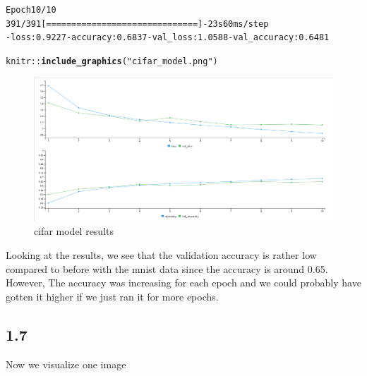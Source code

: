 \documentclass[10pt, a4paper, english]{article}\usepackage[]{graphicx}\usepackage[dvipsnames]{xcolor}
\makeatletter
\def\maxwidth{ %
  \ifdim\Gin@nat@width>\linewidth
    \linewidth
  \else
    \Gin@nat@width
  \fi
}
\newcommand{\hlstr}[1]{\textcolor[rgb]{0.192,0.494,0.8}{#1}}%
\newcommand{\hlopt}[1]{\textcolor[rgb]{0,0,0}{#1}}%
\newcommand{\hlstd}[1]{\textcolor[rgb]{0.345,0.345,0.345}{#1}}%
\newcommand{\hlkwd}[1]{\textcolor[rgb]{0.737,0.353,0.396}{\textbf{#1}}}%
\newenvironment{kframe}{%
 \def\at@end@of@kframe{}%
 \ifinner\ifhmode%
  \def\at@end@of@kframe{\end{minipage}}%
  \begin{minipage}{\columnwidth}%
 \fi\fi%
 \def\FrameCommand##1{\hskip\@totalleftmargin \hskip-\fboxsep
 \colorbox{shadecolor}{##1}\hskip-\fboxsep
     \hskip-\linewidth \hskip-\@totalleftmargin \hskip\columnwidth}%
 \MakeFramed {\advance\hsize-\width
   \@totalleftmargin\z@ \linewidth\hsize
   \@setminipage}}%
 {\par\unskip\endMakeFramed%
 \at@end@of@kframe}
\newenvironment{knitrout}{}{} %
\makeatother
\begin{document}
\begin{knitrout}
\color{fgcolor}\begin{kframe}
\begin{alltt}
Epoch 10/10
391/391 [==============================] - 23s 60ms/step 
- loss: 0.9227 - accuracy: 0.6837 - val_loss: 1.0588 - val_accuracy: 0.6481
\end{alltt}
\end{kframe}
\end{knitrout}

\begin{knitrout}
\color{fgcolor}\begin{kframe}
\begin{alltt}
\hlstd{knitr}\hlopt{::}\hlkwd{include_graphics}\hlstd{(}\hlstr{"cifar_model.png"}\hlstd{)}
\end{alltt}
\end{kframe}\begin{figure}
\includegraphics[width=\maxwidth]{cifar_model} \caption[cifar model results]{cifar model results}\label{fig:unnamed-chunk-19}
\end{figure}

\end{knitrout}
Looking at the results, we see that the validation accuracy is rather low compared to before with the mnist data since the accuracy is around 0.65. However, The accuracy was increasing for each epoch and we could probably have gotten it higher if we just ran it for more epochs. 

\subsection{1.7}
Now we visualize one image
\end{document}
